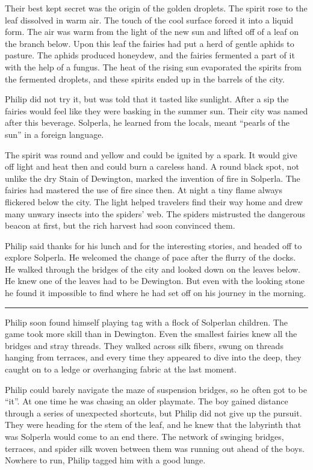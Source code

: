 \documentclass[10pt]{memoir}
\renewcommand{\pfbreakdisplay}{\bigskip \ding{166} \bigskip}
\newcommand{\secbreak}{\fancybreak{\pfbreakdisplay}}
\begin{document}
Their best kept secret was the origin of the golden droplets. The spirit rose
to the leaf dissolved in warm air. The touch of the cool surface forced it into
a liquid form. The air was warm from the light of the new sun and lifted off of
a leaf on the branch below. Upon this leaf the fairies had put a herd of gentle
aphids to pasture. The aphids produced honeydew, and the fairies fermented a
part of it with the help of a fungus. The heat of the rising sun evaporated the
spirits from the fermented droplets, and these spirits ended up in the barrels
of the city.

Philip did not try it, but was told that it tasted like sunlight. After a sip
the fairies would feel like they were basking in the summer sun. Their city was
named after this beverage. Solperla, he learned from the locals, meant ``pearls
of the sun'' in a foreign language.

The spirit was round and yellow and could be ignited by a spark. It would give
off light and heat then and could burn a careless hand. A round black spot,
not unlike the dry Stain of Dewington, marked the invention of fire in
Solperla. The fairies had mastered the use of fire since then. At night a tiny
flame always flickered below the city. The light helped travelers find their
way home and drew many unwary insects into the spiders' web. The spiders
mistrusted the dangerous beacon at first, but the rich harvest had soon
convinced them.

Philip said thanks for his lunch and for the interesting stories, and headed
off to explore Solperla. He welcomed the change of pace after the flurry of the
docks. He walked through the bridges of the city and looked down on the leaves
below. He knew one of the leaves had to be Dewington. But even with the looking
stone he found it impossible to find where he had set off on his journey in the
morning.

\secbreak

Philip soon found himself playing tag with a flock of Solperlan children. The
game took more skill than in Dewington. Even the smallest fairies knew all the
bridges and stray threads. They walked across silk fibers, swung on threads
hanging from terraces, and every time they appeared to dive into the deep, they
caught on to a ledge or overhanging fabric at the last moment.

Philip could barely navigate the maze of suspension bridges, so he often got to
be ``it''. At one time he was chasing an older playmate. The boy gained
distance through a series of unexpected shortcuts, but Philip did not give up
the pursuit. They were heading for the stem of the leaf, and he knew that the
labyrinth that was Solperla would come to an end there. The network of swinging
bridges, terraces, and spider silk woven between them was running out ahead of
the boys. Nowhere to run, Philip tagged him with a good lunge.
\end{document}
